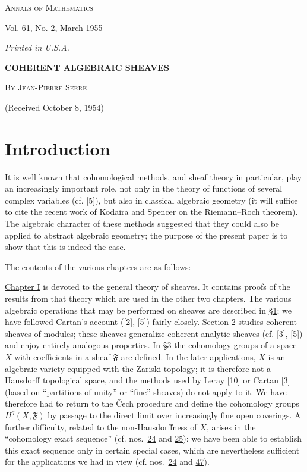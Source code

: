 
\begin{center}
\textsc{Annals of Mathematics}

Vol. 61, No. 2, March 1955

\textit{Printed in U.S.A.}

\vspace{1.2em}
{\Large\bfseries COHERENT ALGEBRAIC SHEAVES}

\vspace{1em}
\textsc{By Jean-Pierre Serre}

(Received October 8, 1954)
\end{center}

\label{fac:introduction}
\section*{Introduction}

It is well known that cohomological methods, and sheaf theory in particular, play an increasingly important role, not only in the theory of functions of several complex variables (cf. [5]), but also in classical algebraic geometry (it will suffice to cite the recent work of Kodaira and Spencer on the Riemann--Roch theorem). The algebraic character of these methods suggested that they could also be applied to abstract algebraic geometry; the purpose of the present paper is to show that this is indeed the case.

The contents of the various chapters are as follows:

\hyperref[fac:I]{Chapter I} is devoted to the general theory of sheaves. It contains proofs of the results from that theory which are used in the other two chapters. The various algebraic operations that may be performed on sheaves are described in \hyperref[fac:I:1]{\S1}; we have followed Cartan's account ([2], [5]) fairly closely. \hyperref[fac:I:2]{Section 2} studies coherent sheaves of modules; these sheaves generalize coherent analytic sheaves (cf. [3], [5]) and enjoy entirely analogous properties. In \hyperref[fac:I:3]{\S3} the cohomology groups of a space $X$ with coefficients in a sheaf $\mathfrak{F}$ are defined. In the later applications, $X$ is an algebraic variety equipped with the Zariski topology; it is therefore not a Hausdorff topological space, and the methods used by Leray [10] or Cartan [3] (based on ``partitions of unity'' or ``fine'' sheaves) do not apply to it. We have therefore had to return to the \v{C}ech procedure and define the cohomology groups $H^q(X,\mathfrak{F})$ by passage to the direct limit over increasingly fine open coverings. A further difficulty, related to the non-Hausdorffness of $X$, arises in the ``cohomology exact sequence'' (cf. nos.~\hyperref[fac:I:3:no:24]{24} and \hyperref[fac:I:3:no:25]{25}): we have been able to establish this exact sequence only in certain special cases, which are nevertheless sufficient for the applications we had in view (cf. nos.~\hyperref[fac:I:3:no:24]{24} and \hyperref[fac:II:3:no:47]{47}).

